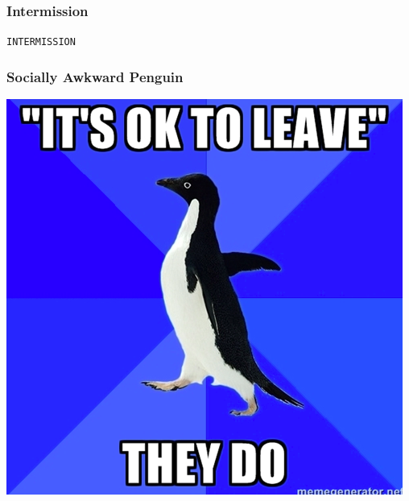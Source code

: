 \documentclass[slidestop,compress,mathserif]{beamer}
\begin{document}
\begin{frame}
	\frametitle{Intermission}
	\begin{center}
		\texttt{INTERMISSION}
	\end{center}
\end{frame}

\begin{frame}
	\frametitle{Socially Awkward Penguin}
	\begin{center}
		\includegraphics[scale=0.3]{img/sap.png}			
	\end{center}	
\end{frame}
\end{document}
